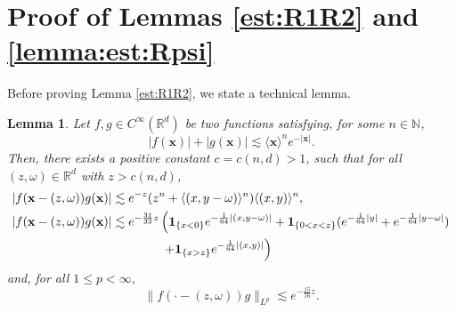\documentclass[reqno,10pt]{amsart}
\newtheorem{lemm}{Lemma}[section]
\numberwithin{equation}{section}
\newcommand{\bx}{\mathbf{x}}
\begin{document}
	\appendix
	
	
	\section{Proof of Lemmas \ref{est:R1R2} and \ref{lemma:est:Rpsi}} \label{app:R1R2}
	Before proving Lemma \ref{est:R1R2}, we state a technical lemma.
	\begin{lemm} \label{lemma:fg}
		Let $f,g \in C^{\infty}(\mathbb R^d)$ be two functions satisfying, for some $n \in \mathbb N$,
		\begin{equation} \label{def:fg}
			|f(\bx)|+|g(\bx)| \lesssim \langle \bx \rangle^n e^{-|\bx|}.
		\end{equation}
		Then, there exists a positive constant $c=c(n,d)>1$, such that for all $(z,\omega) \in \mathbb R^d$ with $z>c(n,d) $,  
		\begin{align} 
			\left|f(\bx-(z,\omega))g(\bx) \right| &\lesssim  e^{-z}(z^n+\langle (x,y-\omega) \rangle^n)\langle (x,y) \rangle^n, \label{est:fg:pointwise.1} \\ 
			\left|f(\bx-(z,\omega))g(\bx) \right| &\lesssim e^{-\frac{31}{32}z}\left( {\bf 1}_{\{x<0\}}e^{-\frac1{64}|(x,y- \omega)|}+{\bf 1}_{\{0<x<z\}}(e^{-\frac1{64}|y|}+e^{-\frac1{64}|y-\omega|}) \right. \nonumber\\ & \left.\quad \quad \quad \quad +{\bf 1}_{\{x>z\}}e^{-\frac1{64}|(x,y)|} \right) \label{est:fg:pointwise.2}
		\end{align}
		and, for all $1 \le p<\infty$,
		\begin{equation} \label{est:fg:Lp}
			\|f(\cdot-(z,\omega))g\|_{L^p} \lesssim e^{-\frac{15}{16}z}.
		\end{equation}
		
	\end{lemm}
	
\end{document}
